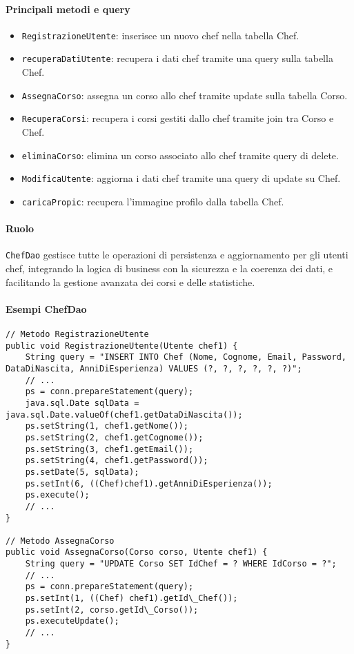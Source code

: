 \paragraph{Principali metodi e query}
\begin{itemize}
    \item \texttt{RegistrazioneUtente}: inserisce un nuovo chef nella tabella Chef.
    \item \texttt{recuperaDatiUtente}: recupera i dati chef tramite una query sulla tabella Chef.
    \item \texttt{AssegnaCorso}: assegna un corso allo chef tramite update sulla tabella Corso.
    \item \texttt{RecuperaCorsi}: recupera i corsi gestiti dallo chef tramite join tra Corso e Chef.
    \item \texttt{eliminaCorso}: elimina un corso associato allo chef tramite query di delete.
    \item \texttt{ModificaUtente}: aggiorna i dati chef tramite una query di update su Chef.
    \item \texttt{caricaPropic}: recupera l'immagine profilo dalla tabella Chef.
\end{itemize}

\paragraph{Ruolo}
\texttt{ChefDao} gestisce tutte le operazioni di persistenza e aggiornamento per gli utenti chef, integrando la logica di business con la sicurezza e la coerenza dei dati, e facilitando la gestione avanzata dei corsi e delle statistiche.

\paragraph{Esempi ChefDao}
\begin{verbatim}
// Metodo RegistrazioneUtente
public void RegistrazioneUtente(Utente chef1) {
    String query = "INSERT INTO Chef (Nome, Cognome, Email, Password, DataDiNascita, AnniDiEsperienza) VALUES (?, ?, ?, ?, ?, ?)";
    // ...
    ps = conn.prepareStatement(query);
    java.sql.Date sqlData = java.sql.Date.valueOf(chef1.getDataDiNascita());
    ps.setString(1, chef1.getNome());
    ps.setString(2, chef1.getCognome());
    ps.setString(3, chef1.getEmail());
    ps.setString(4, chef1.getPassword());
    ps.setDate(5, sqlData);
    ps.setInt(6, ((Chef)chef1).getAnniDiEsperienza());
    ps.execute();
    // ...
}

// Metodo AssegnaCorso
public void AssegnaCorso(Corso corso, Utente chef1) {
    String query = "UPDATE Corso SET IdChef = ? WHERE IdCorso = ?";
    // ...
    ps = conn.prepareStatement(query);
    ps.setInt(1, ((Chef) chef1).getId\_Chef());
    ps.setInt(2, corso.getId\_Corso());
    ps.executeUpdate();
    // ...
}
\end{verbatim}

